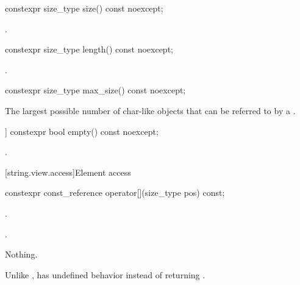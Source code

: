 %
\begin{itemdecl}
constexpr size_type size() const noexcept;
\end{itemdecl}

\begin{itemdescr}
\pnum
\returns
{}.
\end{itemdescr}

%
\begin{itemdecl}
constexpr size_type length() const noexcept;
\end{itemdecl}

\begin{itemdescr}
\pnum
\returns
{}.
\end{itemdescr}

%
\begin{itemdecl}
constexpr size_type max_size() const noexcept;
\end{itemdecl}

\begin{itemdescr}
\pnum
\returns
The largest possible number of char-like objects that can be referred to by a .
\end{itemdescr}

%
\begin{itemdecl}
[[nodiscard]] constexpr bool empty() const noexcept;
\end{itemdecl}

\begin{itemdescr}
\pnum
\returns
{}.
\end{itemdescr}

[string.view.access]{Element access}

%
\begin{itemdecl}
constexpr const_reference operator[](size_type pos) const;
\end{itemdecl}

\begin{itemdescr}
\pnum
\requires
{}.

\pnum
\returns
{}.

\pnum
\throws
Nothing.

\pnum
\begin{note}
Unlike ,
 has undefined behavior instead of returning .
\end{note}
\end{itemdescr}

